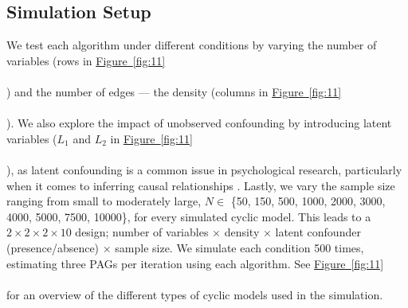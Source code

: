 \documentclass[twoside, 11pt]{article}
\newcommand*{\figref}[2][]{%
  \hyperref[{fig:#2}]{%
    Figure~\ref*{fig:#2}%
    \ifx\\#1\\%
    \else
      #1%
    \fi
  }%
}
\begin{document}



  
\subsection{Simulation Setup}
We test each algorithm under different conditions by varying the number of variables (rows in \figref{11}) and the number of edges --- the density (columns in \figref{11}). We also explore the impact of unobserved confounding by introducing latent variables ($L_1$ and $L_2$ in \figref{11}), as latent confounding is a common issue in psychological research, particularly when it comes to inferring causal relationships \citep{hallquist2019, rohr2022}. Lastly, we vary the sample size ranging from small to moderately large, $N \in$ \{50, 150, 500, 1000, 2000, 3000, 4000, 5000, 7500, 10000\}, for every simulated cyclic model. This leads to a $2 \times 2 \times 2 \times 10$ design; number of variables $\times$ density $\times$ latent confounder (presence/absence) $\times$ sample size. We simulate each condition 500 times, estimating three PAGs per iteration using each algorithm. See \figref[]{11} for an overview of the different types of cyclic models used in the simulation.

\vspace{3mm}
\end{document}
